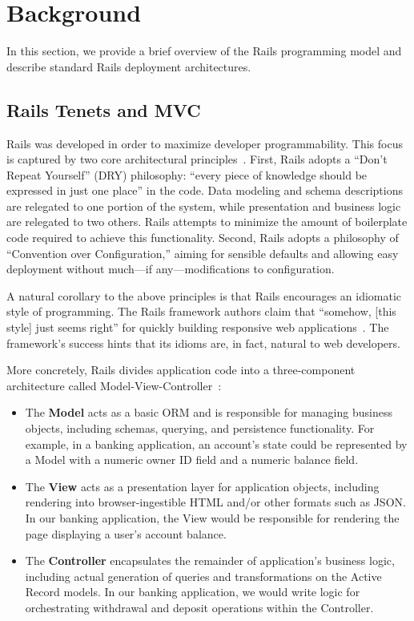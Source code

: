 
\section{Background}
\label{sec:motivation}

In this section, we provide a brief overview of the Rails programming model and describe standard Rails deployment architectures.

\subsection{Rails Tenets and MVC}
\label{sec:mvc}

Rails was developed in order to maximize developer programmability. This focus is captured by two core architectural principles~\cite{rails-book}. First, Rails adopts a ``Don't Repeat Yourself'' (DRY) philosophy: ``every piece of knowledge should be expressed in just one place'' in the code. Data modeling and schema descriptions are relegated to one portion of the system, while presentation and business logic are relegated to two others. Rails attempts to minimize the amount of boilerplate code required to achieve this functionality. Second, Rails adopts a philosophy of ``Convention over Configuration,'' aiming for sensible defaults and allowing easy deployment without much---if any---modifications to configuration.

A natural corollary to the above principles is that Rails encourages an idiomatic style of programming. The Rails framework authors claim that ``somehow, [this style] just seems right'' for quickly building responsive web applications~\cite{rails-book}. The framework's success hints that its idioms are, in fact, natural to web developers.

More concretely, Rails divides application code into a three-component architecture called Model-View-Controller~\cite{gangoffour,mvc}:

\begin{itemize}
\item The \textbf{Model} acts as a basic ORM and is responsible for managing business objects, including schemas, querying, and persistence functionality. For example, in a banking application, an account's state could be represented by a Model with a numeric owner ID field and a numeric balance field.

\item The \textbf{View} acts as a presentation layer for application objects, including rendering into browser-ingestible HTML and/or other formats such as JSON. In our banking application, the View would be responsible for rendering the page displaying a user's account balance.

\item The \textbf{Controller} encapsulates the remainder of application's business logic, including actual generation of queries and transformations on the Active Record models. In our banking application, we would write logic for orchestrating withdrawal and deposit operations within the Controller.
\end{itemize}

